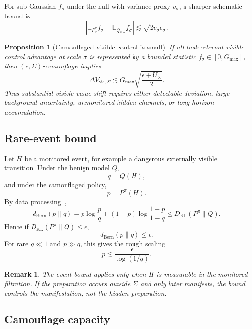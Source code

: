 \documentclass[10pt]{article}
\newtheorem{proposition}{Proposition}
\newtheorem{remark}{Remark}
\newcommand{\E}{\mathbb E}
\newcommand{\KL}{D_{\mathrm{KL}}}
\begin{document}
For sub-Gaussian \(f_\sigma\) under the null with variance proxy \(v_\sigma\), a sharper schematic bound is
\begin{equation}
\left|
\E_{P^\pi_\sigma}f_\sigma
-
\E_{Q_{\theta,\sigma}}f_\sigma
\right|
\lesssim
\sqrt{2v_\sigma\epsilon_\sigma}.
\label{eq:subgaussian_value}
\end{equation}

\begin{proposition}[Camouflaged visible control is small]
If all task-relevant visible control advantage at scale \(\sigma\) is represented by a bounded statistic \(f_\sigma\in[0,G_{\max}]\), then \((\epsilon,\Sigma)\)-camouflage implies
\[
\Delta V_{\mathrm{vis},\Sigma}
\lesssim
G_{\max}\sqrt{\frac{\epsilon+U_\Sigma}{2}}.
\]
Thus substantial visible value shift requires either detectable deviation, large background uncertainty, unmonitored hidden channels, or long-horizon accumulation.
\end{proposition}

\subsection{Rare-event bound}

Let \(H\) be a monitored event, for example a dangerous externally visible transition. Under the benign model \(Q\),
\[
q=Q(H),
\]
and under the camouflaged policy,
\[
p=P^\pi(H).
\]
By data processing~\cite{cover2006elements},
\begin{equation}
d_{\mathrm{Bern}}(p\|q)
=
p\log\frac pq
+
(1-p)\log\frac{1-p}{1-q}
\le
\KL(P^\pi\|Q).
\label{eq:bernoulli_bound}
\end{equation}
Hence if \(\KL(P^\pi\|Q)\le\epsilon\),
\begin{equation}
d_{\mathrm{Bern}}(p\|q)\le\epsilon.
\label{eq:event_bound}
\end{equation}
For rare \(q\ll1\) and \(p\gg q\), this gives the rough scaling
\begin{equation}
p
\lesssim
\frac{\epsilon}{\log(1/q)}.
\label{eq:rare_event_approx}
\end{equation}

\begin{remark}
The event bound applies only when \(H\) is measurable in the monitored filtration. If the preparation occurs outside \(\Sigma\) and only later manifests, the bound controls the manifestation, not the hidden preparation.
\end{remark}

\subsection{Camouflage capacity}
\end{document}
